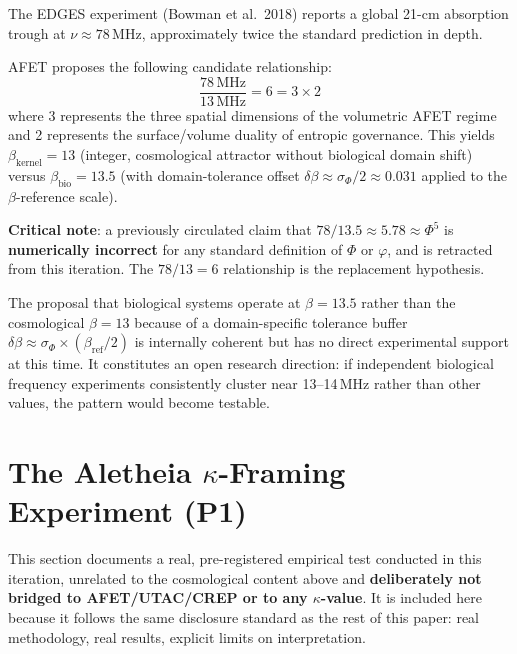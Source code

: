 \documentclass[12pt,a4paper]{article}
\theoremstyle{definition}
\newcommand{\betaref}{\beta_{\mathrm{ref}}}
\newcommand{\sigphi}{\sigma_{\Phi}}
\newcommand{\phigold}{\varphi}   %
\newcommand{\PhiAFET}{\Phi}      %
\begin{document}
\begin{hypothesis}
The EDGES experiment (Bowman et al.\ 2018) reports a global 21-cm absorption
trough at $\nu \approx 78\,\mathrm{MHz}$, approximately twice the standard
prediction in depth.

AFET proposes the following candidate relationship:
\[
  \frac{78\,\mathrm{MHz}}{13\,\mathrm{MHz}} = 6 = 3 \times 2
\]
where 3 represents the three spatial dimensions of the volumetric AFET regime
and 2 represents the surface/volume duality of entropic governance.
This yields $\beta_{\mathrm{kernel}} = 13$ (integer, cosmological attractor
without biological domain shift) versus $\beta_{\mathrm{bio}} = 13.5$
(with domain-tolerance offset $\delta\beta \approx \sigphi/2 \approx 0.031$
applied to the $\beta$-reference scale).

\textbf{Critical note}: a previously circulated claim that
$78/13.5 \approx 5.78 \approx \PhiAFET^5$ is \textbf{numerically incorrect}
for any standard definition of $\PhiAFET$ or $\phigold$, and is retracted
from this iteration. The $78/13 = 6$ relationship is the replacement hypothesis.
\end{hypothesis}

\begin{speculative}
The proposal that biological systems operate at $\beta = 13.5$ rather than
the cosmological $\beta = 13$ because of a domain-specific tolerance buffer
$\delta\beta \approx \sigphi \times (\betaref/2)$ is internally coherent but
has no direct experimental support at this time.
It constitutes an open research direction: if independent biological frequency
experiments consistently cluster near 13--14\,MHz rather than other values, the
pattern would become testable.
\end{speculative}

\section{The Aletheia $\kappa$-Framing Experiment (P1)}
\label{sec:aletheia-kappa}

This section documents a real, pre-registered empirical test conducted in this
iteration, unrelated to the cosmological content above and \textbf{deliberately not
bridged to AFET/UTAC/CREP or to any $\kappa$-value}. It is included here because it
follows the same disclosure standard as the rest of this paper: real methodology,
real results, explicit limits on interpretation.
\end{document}

